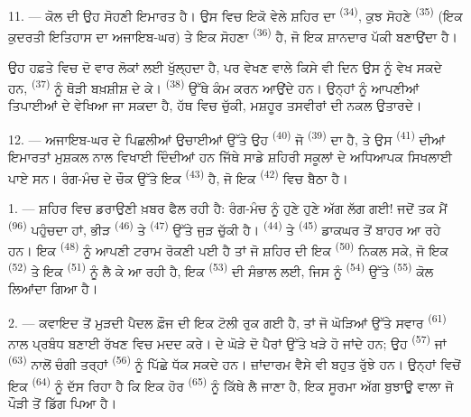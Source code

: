 11. --- ਕੋਲ ਦੀ ਉਹ ਸੋਹਣੀ ਇਮਾਰਤ  ਹੈ। ਉਸ ਵਿਚ ਇਕੋ ਵੇਲੇ ਸ਼ਹਿਰ ਦਾ
 \textsuperscript{(34)}, ਕੁਝ ਸੋਹਣੇ
 \textsuperscript{(35)} (ਇਕ ਕੁਦਰਤੀ ਇਤਿਹਾਸ ਦਾ
ਅਜਾਇਬ-ਘਰ) ਤੇ ਇਕ ਸੋਹਣਾ  \textsuperscript{(36)} ਹੈ, ਜੋ ਇਕ ਸ਼ਾਨਦਾਰ
ਪੱਕੀ  ਬਣਾਉਂਦਾ ਹੈ।

ਉਹ ਹਫ਼ਤੇ ਵਿਚ ਦੋ ਵਾਰ ਲੋਕਾਂ ਲਈ ਖੁੱਲ੍ਹਦਾ ਹੈ, ਪਰ ਵੇਖਣ ਵਾਲੇ ਕਿਸੇ ਵੀ ਦਿਨ ਉਸ ਨੂੰ ਵੇਖ
ਸਕਦੇ ਹਨ,  \textsuperscript{(37)} ਨੂੰ ਥੋੜੀ ਬਖ਼ਸ਼ੀਸ਼ ਦੇ ਕੇ।
 \textsuperscript{(38)} ਉੱਥੇ ਕੰਮ ਕਰਨ ਆਉਂਦੇ ਹਨ। ਉਨ੍ਹਾਂ ਨੂੰ ਆਪਣੀਆਂ
ਤਿਪਾਈਆਂ ਦੇ  ਵੇਖਿਆ ਜਾ ਸਕਦਾ ਹੈ, ਹੱਥ ਵਿਚ  ਚੁੱਕੀ,
ਮਸ਼ਹੂਰ ਤਸਵੀਰਾਂ ਦੀ ਨਕਲ ਉਤਾਰਦੇ।

12. --- ਅਜਾਇਬ-ਘਰ ਦੇ ਪਿਛਲੀਆਂ ਉਚਾਈਆਂ ਉੱਤੇ ਉਹ  \textsuperscript{(40)}
ਜੋ  \textsuperscript{(39)} ਦਾ ਹੈ, ਤੇ ਉਸ
 \textsuperscript{(41)} ਦੀਆਂ ਇਮਾਰਤਾਂ ਮੁਸ਼ਕਲ ਨਾਲ
ਵਿਖਾਈ ਦਿੰਦੀਆਂ ਹਨ ਜਿੱਥੇ ਸਾਡੇ ਸ਼ਹਿਰੀ ਸਕੂਲਾਂ ਦੇ ਅਧਿਆਪਕ ਸਿਖਲਾਈ ਪਾਏ ਸਨ। ਰੰਗ-ਮੰਚ ਦੇ
ਚੌਕ ਉੱਤੇ ਇਕ  \textsuperscript{(43)} ਹੈ, ਜੋ ਇਕ 
\textsuperscript{(42)} ਵਿਚ ਬੈਠਾ ਹੈ।

\VUsaut{5.0mm}
\VUsaut{3.0mm}

\VUsaut{3.4mm}

1. --- ਸ਼ਹਿਰ ਵਿਚ ਡਰਾਉਣੀ ਖ਼ਬਰ ਫੈਲ ਰਹੀ ਹੈ: ਰੰਗ-ਮੰਚ ਨੂੰ ਹੁਣੇ ਹੁਣੇ ਅੱਗ ਲੱਗ ਗਈ! ਜਦੋਂ
ਤਕ ਮੈਂ  \textsuperscript{(96)} ਪਹੁੰਚਦਾ ਹਾਂ, ਭੀੜ 
\textsuperscript{(46)} ਤੇ  \textsuperscript{(47)} ਉੱਤੇ ਜੁੜ ਚੁੱਕੀ ਹੈ।
 \textsuperscript{(44)} ਤੇ 
\textsuperscript{(45)} ਡਾਕਘਰ ਤੋਂ ਬਾਹਰ ਆ ਰਹੇ ਹਨ। ਇਕ 
\textsuperscript{(48)} ਨੂੰ ਆਪਣੀ ਟਰਾਮ ਰੋਕਣੀ ਪਈ ਹੈ ਤਾਂ ਜੋ ਸ਼ਹਿਰ ਦੀ ਇਕ
 \textsuperscript{(50)} ਨਿਕਲ ਸਕੇ, ਜੋ ਇਕ 
\textsuperscript{(52)} ਤੇ ਇਕ  \textsuperscript{(51)} ਨੂੰ ਲੈ ਕੇ ਆ ਰਹੀ ਹੈ,
ਇਕ  \textsuperscript{(53)} ਦੀ ਸੰਭਾਲ ਲਈ, ਜਿਸ ਨੂੰ 
\textsuperscript{(54)} ਉੱਤੇ  \textsuperscript{(55)} ਕੋਲ ਲਿਆਂਦਾ
ਗਿਆ ਹੈ।

2. --- ਕਵਾਇਦ ਤੋਂ ਮੁੜਦੀ ਪੈਦਲ ਫ਼ੌਜ ਦੀ ਇਕ ਟੋਲੀ ਰੁਕ ਗਈ ਹੈ, ਤਾਂ ਜੋ ਘੋੜਿਆਂ ਉੱਤੇ ਸਵਾਰ
 \textsuperscript{(61)} ਨਾਲ ਪ੍ਰਬੰਧ ਬਣਾਈ ਰੱਖਣ ਵਿਚ ਮਦਦ ਕਰੇ।
 ਦੇ ਘੋੜੇ ਦੋ ਪੈਰਾਂ ਉੱਤੇ ਖੜੇ ਹੋ ਜਾਂਦੇ ਹਨ; ਉਹ 
\textsuperscript{(57)} ਜਾਂ  \textsuperscript{(63)} ਨਾਲੋਂ ਚੰਗੀ
ਤਰ੍ਹਾਂ  \textsuperscript{(56)} ਨੂੰ ਪਿੱਛੇ ਧੱਕ ਸਕਦੇ ਹਨ। ਜ਼ਾਂਦਾਰਮ
ਵੈਸੇ ਵੀ ਬਹੁਤ ਰੁੱਝੇ ਹਨ। ਉਨ੍ਹਾਂ ਵਿਚੋਂ ਇਕ 
\textsuperscript{(64)} ਨੂੰ ਦੱਸ ਰਿਹਾ ਹੈ ਕਿ ਇਕ ਹੋਰ 
\textsuperscript{(65)} ਨੂੰ ਕਿੱਥੇ ਲੈ ਜਾਣਾ ਹੈ, ਇਕ ਸੂਰਮਾ ਅੱਗ ਬੁਝਾਊ ਵਾਲਾ ਜੋ ਪੌੜੀ ਤੋਂ
ਡਿੱਗ ਪਿਆ ਹੈ।

